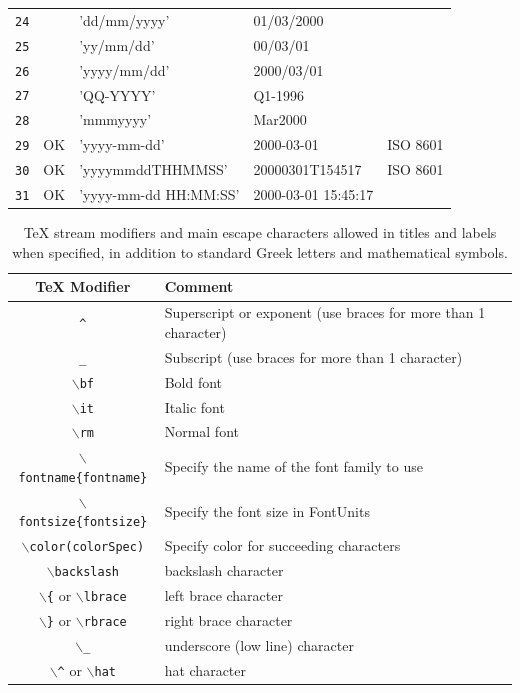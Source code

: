 \begin{table}[htp]
\begin{center}
\begin{tabular}{|c|c|l|l|l|}
\texttt{24}		&		& 'dd/mm/yyyy'				& 01/03/2000	&\\
\texttt{25}		&		& 'yy/mm/dd'				& 00/03/01	&\\
\texttt{26}		&		& 'yyyy/mm/dd'				& 2000/03/01	&\\
\texttt{27}		&		& 'QQ-YYYY'					& Q1-1996	&\\
\texttt{28}		&		& 'mmmyyyy'					& Mar2000	&\\
\texttt{29}		& OK	& 'yyyy-mm-dd'				& 2000-03-01	& ISO 8601\\
\texttt{30}		& OK	& 'yyyymmddTHHMMSS'			& 20000301T154517	& ISO 8601\\
\texttt{31}		& OK	& 'yyyy-mm-dd HH:MM:SS'		& 2000-03-01 15:45:17	&\\
\hline
\end{tabular}
\end{center}
\end{table}


\begin{table}[htp]
\caption{TeX stream modifiers and main escape characters allowed in titles and labels when specified, in addition to standard Greek letters and mathematical symbols.}
\label{texcommands}
\begin{center}
\begin{tabular}{|c|l|}
\hline
\textbf{TeX Modifier} & \textbf{Comment}\\
\hline
\texttt{\^}  & Superscript or exponent (use braces for more than 1 character)\\
\texttt{\_}  & Subscript (use braces for more than 1 character)\\
\texttt{$\backslash$bf}  & Bold font\\
\texttt{$\backslash$it}  & Italic font\\
\texttt{$\backslash$rm}  & Normal font\\
\texttt{$\backslash$fontname\{fontname\}}  & Specify the name of the font family to use\\
\texttt{$\backslash$fontsize\{fontsize\}}  & Specify the font size in FontUnits\\
\texttt{$\backslash$color(colorSpec)}  & Specify color for succeeding characters\\
\hline
\texttt{$\backslash$backslash}  & backslash character\\
\texttt{$\backslash$\{} or \texttt{$\backslash$lbrace}  & left brace character\\
\texttt{$\backslash$\}} or \texttt{$\backslash$rbrace}  & right brace character\\
\texttt{$\backslash$\_}  & underscore (low line) character\\
\texttt{$\backslash$\^} or \texttt{$\backslash$hat}  & hat character\\
\hline
\end{tabular}
\end{center}
\end{table}

